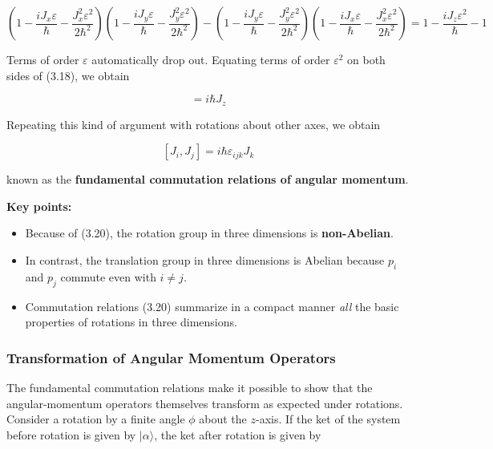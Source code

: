 \documentclass[11pt,a4paper]{article}
\begin{document}
\begin{equation}
\left(1 - \frac{iJ_x\varepsilon}{\hbar} - \frac{J_x^2\varepsilon^2}{2\hbar^2}\right)\left(1 - \frac{iJ_y\varepsilon}{\hbar} - \frac{J_y^2\varepsilon^2}{2\hbar^2}\right) - \left(1 - \frac{iJ_y\varepsilon}{\hbar} - \frac{J_y^2\varepsilon^2}{2\hbar^2}\right)\left(1 - \frac{iJ_x\varepsilon}{\hbar} - \frac{J_x^2\varepsilon^2}{2\hbar^2}\right) = 1 - \frac{iJ_z\varepsilon^2}{\hbar} - 1
\tag{3.18}
\end{equation}

Terms of order $\varepsilon$ automatically drop out. Equating terms of order $\varepsilon^2$ on both sides of (3.18), we obtain

\begin{equation}
[J_x, J_y] = i\hbar J_z
\tag{3.19}
\end{equation}

Repeating this kind of argument with rotations about other axes, we obtain

\begin{equation}
\boxed{[J_i, J_j] = i\hbar\varepsilon_{ijk}J_k}
\tag{3.20}
\end{equation}

known as the \textbf{fundamental commutation relations of angular momentum}.

\textbf{Key points:}
\begin{itemize}[leftmargin=*]
\item Because of (3.20), the rotation group in three dimensions is \textbf{non-Abelian}.
\item In contrast, the translation group in three dimensions is Abelian because $p_i$ and $p_j$ commute even with $i \neq j$.
\item Commutation relations (3.20) summarize in a compact manner \textit{all} the basic properties of rotations in three dimensions.
\end{itemize}

\subsubsection{Transformation of Angular Momentum Operators}

The fundamental commutation relations make it possible to show that the angular-momentum operators themselves transform as expected under rotations. Consider a rotation by a finite angle $\phi$ about the $z$-axis. If the ket of the system before rotation is given by $|\alpha\rangle$, the ket after rotation is given by
\end{document}
